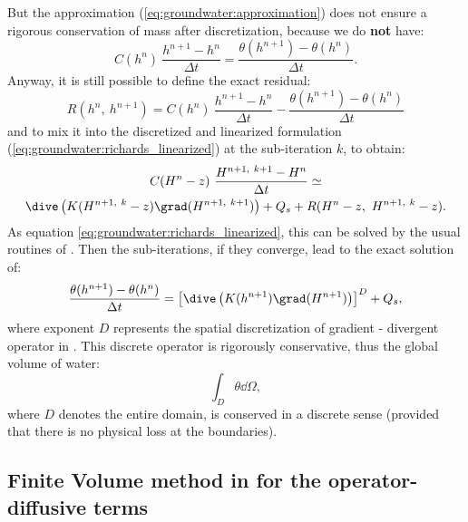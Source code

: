But the approximation (\eqref{eq:groundwater:approximation}) does not ensure a rigorous conservation of mass after discretization, because we do \textbf{not} have:
$$C(h^{n}) \ \frac{h^{n+1} - h^n}{\Delta t} = \frac{\theta(h^{n+1}) - \theta(h^n)}{\Delta t}.$$
Anyway, it is still possible to define the exact residual:
\begin{equation}
\label{eq:groundwater:residual}
  R(h^n, \ h^{n+1}) = C(h^{n}) \ \frac{h^{n+1} - h^n}{\Delta t} - \frac{\theta(h^{n+1}) - \theta(h^n)}{\Delta t}
\end{equation}
and to mix it into the discretized and linearized formulation (\eqref{eq:groundwater:richards_linearized}) at the sub-iteration $k$, to obtain:
\begin{multline}
\label{eq:groundwater:richards_final}
 C(H^{n}-z) \ \frac{H^{ n+1, \ k+1} - H^n}{\Delta t} \simeq \\ \dive \left( K(H^{ n+1, \ k} - z) \grad(H^{ n+1, \ k+1}) \right) + Q_s + R(H^n - z, \ H^{ n+1, \ k} - z).
\end{multline}
As equation \eqref{eq:groundwater:richards_linearized}, this can be solved by the usual routines of \CS.
Then the sub-iterations, if they converge, lead to the exact solution of:
\begin{equation}
 \label{eq:groundwater:richards_final_bis}
\frac{ \theta(h^{n+1}) - \theta(h^n) }{\Delta t} = \left[ \dive \left( K(h^{n+1}) \grad(H^{n+1}) \right) \right]^D + Q_s,
\end{equation}
where exponent $D$ represents the spatial discretization of gradient - divergent operator in \CS.
This discrete operator
is rigorously conservative, thus the global volume of water:
$$\int_D{{\theta} \dd \Omega},$$
where $D$ denotes the entire domain, is conserved in a discrete sense (provided that there is no physical loss at the boundaries).

\subsection{Finite Volume method in \CS for the operator-diffusive terms}\label{sec:groundwater:operator_diffusive}

